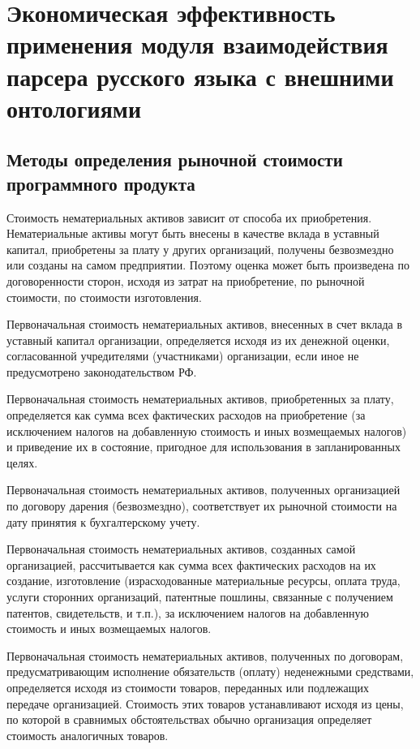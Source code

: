\indent \section{Экономическая эффективность применения модуля взаимодействия парсера русского языка с внешними онтологиями}

\subsection{Методы определения рыночной стоимости программного продукта}

Стоимость нематериальных активов зависит от способа их приобретения. Нематериальные активы могут быть внесены в качестве вклада в уставный капитал, приобретены за плату у других организаций, получены безвозмездно или созданы на самом предприятии. Поэтому оценка может быть произведена по договоренности сторон, исходя из затрат на приобретение, по рыночной стоимости, по стоимости изготовления.

Первоначальная стоимость нематериальных активов, внесенных в счет вклада в уставный капитал организации, определяется исходя из их денежной оценки, согласованной учредителями (участниками) организации, если иное не предусмотрено законодательством РФ.

Первоначальная стоимость нематериальных активов, приобретенных за плату, определяется как сумма всех фактических расходов на приобретение (за исключением налогов на добавленную стоимость и иных возмещаемых налогов) и приведение их в состояние, пригодное для использования в запланированных целях. 

Первоначальная стоимость нематериальных активов, полученных организацией по договору дарения (безвозмездно), соответствует их рыночной стоимости на дату принятия к бухгалтерскому учету.

Первоначальная стоимость нематериальных активов, созданных самой организацией, рассчитывается как сумма всех фактических расходов на их создание, изготовление (израсходованные материальные ресурсы, оплата труда, услуги сторонних организаций, патентные пошлины, связанные с получением патентов, свидетельств, и т.п.), за исключением налогов на добавленную стоимость и иных возмещаемых налогов.

Первоначальная стоимость нематериальных активов, полученных по договорам, предусматривающим исполнение обязательств (оплату) неденежными средствами, определяется исходя из стоимости товаров, переданных или подлежащих передаче организацией. Стоимость этих товаров устанавливают исходя из цены, по которой в сравнимых обстоятельствах обычно организация определяет стоимость аналогичных товаров.

